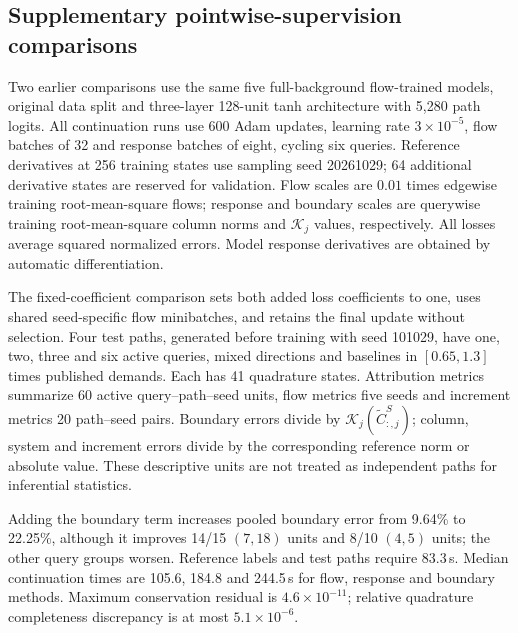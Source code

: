 \subsection{Supplementary pointwise-supervision comparisons}\label{app:legacy-learning}\label{app:learning-protocol}\label{app:calibration-protocol}
Two earlier comparisons use the same five full-background flow-trained
models, original data split and three-layer 128-unit tanh architecture
with 5,280 path logits. All continuation runs use 600 Adam updates,
learning rate $3\times10^{-5}$, flow batches of 32 and response batches
of eight, cycling six queries. Reference derivatives at 256 training
states use sampling seed 20261029; 64 additional derivative states are
reserved for validation. Flow scales are $0.01$ times edgewise training
root-mean-square flows; response and boundary scales are querywise
training root-mean-square column norms and $\mathcal K_j$ values,
respectively. All losses average squared normalized errors. Model
response derivatives are obtained by automatic differentiation.

The fixed-coefficient comparison sets both added loss coefficients to one,
uses shared seed-specific flow minibatches, and retains the final update
without selection. Four test paths, generated before training with seed
101029, have one, two, three and six active queries, mixed directions and
baselines in $[0.65,1.3]$ times published demands. Each has 41 quadrature
states. Attribution metrics summarize 60 active query--path--seed units,
flow metrics five seeds and increment metrics 20 path--seed pairs.
Boundary errors divide by $\mathcal K_j(\widetilde C^S_{:,j})$; column,
system and increment errors divide by the corresponding reference norm
or absolute value. These descriptive units are not treated as independent
paths for inferential statistics.

Adding the boundary term increases pooled boundary error from 9.64\% to
22.25\%, although it improves 14/15 $(7,18)$ units and 8/10 $(4,5)$
units; the other query groups worsen. Reference labels and test paths
require 83.3\,s. Median continuation times are 105.6, 184.8 and 244.5\,s
for flow, response and boundary methods. Maximum conservation residual
is $4.6\times10^{-11}$; relative quadrature completeness discrepancy is
at most $5.1\times10^{-6}$.

